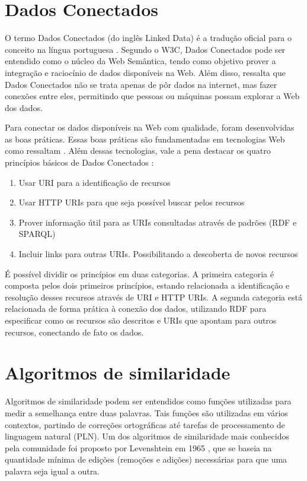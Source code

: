 \section{Dados Conectados}
O termo Dados Conectados (do inglês Linked Data) é a tradução oficial para o conceito na língua portuguesa \cite{Isotani2015}. Segundo o W3C, Dados Conectados pode ser entendido como o núcleo da Web Semântica, tendo como objetivo prover a integração e raciocínio de dados disponíveis na Web. Além disso,  ressalta que Dados Conectados não se trata apenas de pôr dados na internet, mas fazer conexões entre eles, permitindo que pessoas ou máquinas possam explorar a Web dos dados.

Para conectar os dados disponíveis na Web com qualidade, foram desenvolvidas as boas práticas. Essas boas práticas são fundamentadas em tecnologias Web como ressaltam . Além dessas tecnologias, vale a pena destacar os quatro princípios básicos de Dados Conectados \cite{berners2006linked}: 

\begin{enumerate}
	\item Usar URI para a identificação de recursos
	\item Usar HTTP URIs para que seja possível buscar pelos recursos 
	\item Prover informação útil para as URIs consultadas através de padrões (RDF e SPARQL) 
	\item Incluir links para outras URIs. Possibilitando a descoberta de novos recursos
\end{enumerate}

É possível dividir os princípios em duas categorias. A primeira categoria é composta pelos dois primeiros princípios, estando relacionada a identificação e resolução desses recursos através de URI e HTTP URIs. A segunda categoria está relacionada de forma prática à conexão dos dados, utilizando RDF para especificar como os recursos são descritos e URIs que apontam para outros recursos, conectando de fato os dados.

\section{Algoritmos de similaridade}

Algoritmos de similaridade podem ser entendidos como funções utilizadas para medir a semelhança entre duas palavras. Tais funções são utilizadas em vários contextos, partindo de correções ortográficas até tarefas de processamento de linguagem natural (PLN). Um dos algoritmos de similaridade mais conhecidos pela comunidade foi proposto por Levenshtein em 1965 \cite{levenshtein1966binary}, que se baseia na quantidade mínima de edições (remoções e adições) necessárias para que uma palavra seja igual a outra.  


